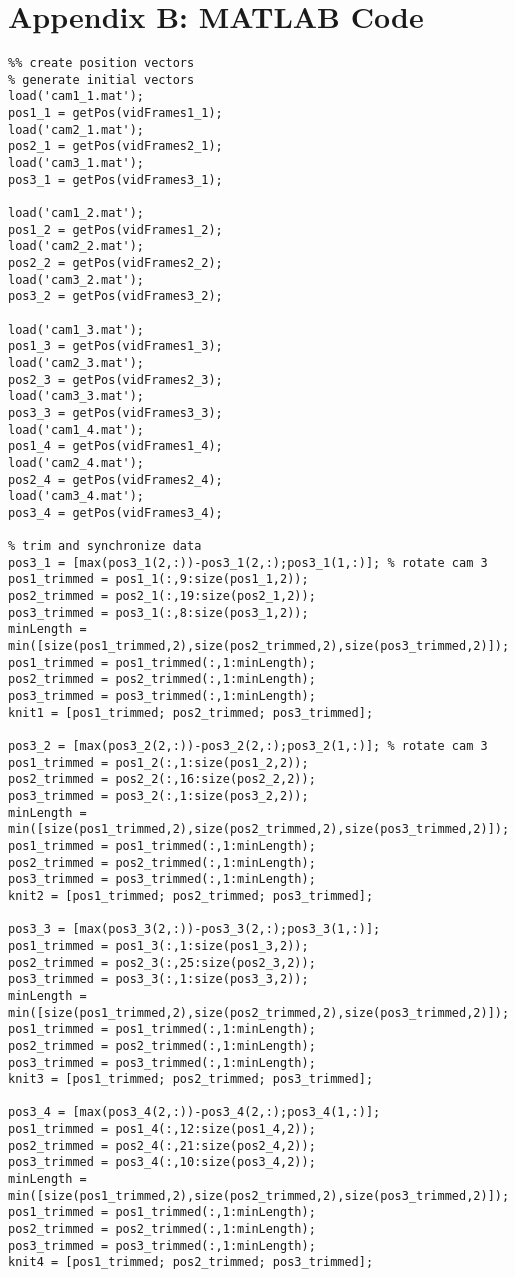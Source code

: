 \documentclass[a4paper,10 pt]{article}
\begin{document}
\section{Appendix B: MATLAB Code}
\begin{lstlisting}
%% create position vectors
% generate initial vectors
load('cam1_1.mat');
pos1_1 = getPos(vidFrames1_1);
load('cam2_1.mat');
pos2_1 = getPos(vidFrames2_1);
load('cam3_1.mat');
pos3_1 = getPos(vidFrames3_1);

load('cam1_2.mat');
pos1_2 = getPos(vidFrames1_2);
load('cam2_2.mat');
pos2_2 = getPos(vidFrames2_2);
load('cam3_2.mat');
pos3_2 = getPos(vidFrames3_2);

load('cam1_3.mat');
pos1_3 = getPos(vidFrames1_3);
load('cam2_3.mat');
pos2_3 = getPos(vidFrames2_3);
load('cam3_3.mat');
pos3_3 = getPos(vidFrames3_3);
load('cam1_4.mat');
pos1_4 = getPos(vidFrames1_4);
load('cam2_4.mat');
pos2_4 = getPos(vidFrames2_4);
load('cam3_4.mat');
pos3_4 = getPos(vidFrames3_4);

% trim and synchronize data
pos3_1 = [max(pos3_1(2,:))-pos3_1(2,:);pos3_1(1,:)]; % rotate cam 3
pos1_trimmed = pos1_1(:,9:size(pos1_1,2));
pos2_trimmed = pos2_1(:,19:size(pos2_1,2));
pos3_trimmed = pos3_1(:,8:size(pos3_1,2));
minLength = min([size(pos1_trimmed,2),size(pos2_trimmed,2),size(pos3_trimmed,2)]);
pos1_trimmed = pos1_trimmed(:,1:minLength);
pos2_trimmed = pos2_trimmed(:,1:minLength);
pos3_trimmed = pos3_trimmed(:,1:minLength);
knit1 = [pos1_trimmed; pos2_trimmed; pos3_trimmed];

pos3_2 = [max(pos3_2(2,:))-pos3_2(2,:);pos3_2(1,:)]; % rotate cam 3
pos1_trimmed = pos1_2(:,1:size(pos1_2,2));
pos2_trimmed = pos2_2(:,16:size(pos2_2,2));
pos3_trimmed = pos3_2(:,1:size(pos3_2,2));
minLength = min([size(pos1_trimmed,2),size(pos2_trimmed,2),size(pos3_trimmed,2)]);
pos1_trimmed = pos1_trimmed(:,1:minLength);
pos2_trimmed = pos2_trimmed(:,1:minLength);
pos3_trimmed = pos3_trimmed(:,1:minLength);
knit2 = [pos1_trimmed; pos2_trimmed; pos3_trimmed];

pos3_3 = [max(pos3_3(2,:))-pos3_3(2,:);pos3_3(1,:)];
pos1_trimmed = pos1_3(:,1:size(pos1_3,2));
pos2_trimmed = pos2_3(:,25:size(pos2_3,2));
pos3_trimmed = pos3_3(:,1:size(pos3_3,2));
minLength = min([size(pos1_trimmed,2),size(pos2_trimmed,2),size(pos3_trimmed,2)]);
pos1_trimmed = pos1_trimmed(:,1:minLength);
pos2_trimmed = pos2_trimmed(:,1:minLength);
pos3_trimmed = pos3_trimmed(:,1:minLength);
knit3 = [pos1_trimmed; pos2_trimmed; pos3_trimmed];

pos3_4 = [max(pos3_4(2,:))-pos3_4(2,:);pos3_4(1,:)];
pos1_trimmed = pos1_4(:,12:size(pos1_4,2));
pos2_trimmed = pos2_4(:,21:size(pos2_4,2));
pos3_trimmed = pos3_4(:,10:size(pos3_4,2));
minLength = min([size(pos1_trimmed,2),size(pos2_trimmed,2),size(pos3_trimmed,2)]);
pos1_trimmed = pos1_trimmed(:,1:minLength);
pos2_trimmed = pos2_trimmed(:,1:minLength);
pos3_trimmed = pos3_trimmed(:,1:minLength);
knit4 = [pos1_trimmed; pos2_trimmed; pos3_trimmed];


\end{lstlisting}
\end{document}
